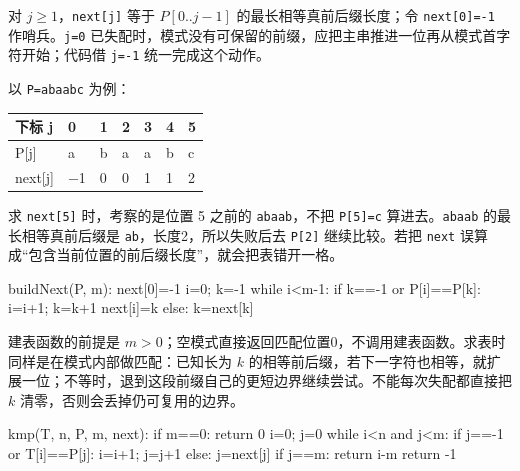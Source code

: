 对 \(j\ge1\)，\texttt{next[j]} 等于 \(P[0..j-1]\) 的最长相等真前后缀长度；令 \texttt{next[0]=\allowbreak{}-1} 作哨兵。\texttt{j=\allowbreak{}0} 已失配时，模式没有可保留的前缀，应把主串推进一位再从模式首字符开始；代码借 \texttt{j=\allowbreak{}-1} 统一完成这个动作。

以 \texttt{P=\allowbreak{}abaabc} 为例：

\begin{wideblock}\par\medskip\noindent\begin{minipage}{\linewidth}\fontsize{9.3}{12}\selectfont\begin{tabularx}{\linewidth}{@{}YYYYYYY@{}}
\toprule\noalign{}
下标 j & 0 & 1 & 2 & 3 & 4 & 5 \\
\midrule\noalign{}


P{[}j{]} & a & b & a & a & b & c \\
next{[}j{]} & \ensuremath{-}1 & 0 & 0 & 1 & 1 & 2 \\
\bottomrule\end{tabularx}
\end{minipage}\par\medskip\end{wideblock}

求 \texttt{next[5]} 时，考察的是位置 5 之前的 \texttt{abaab}，不把 \texttt{P[5]=\allowbreak{}c} 算进去。\texttt{abaab} 的最长相等真前后缀是 \texttt{ab}，长度2，所以失败后去 \texttt{P[2]} 继续比较。若把 \texttt{next} 误算成``包含当前位置的前后缀长度''，就会把表错开一格。

\begin{codeblock}[language={}]
buildNext(P, m):
    next[0]=-1
    i=0; k=-1
    while i<m-1:
        if k==-1 or P[i]==P[k]:
            i=i+1; k=k+1
            next[i]=k
        else:
            k=next[k]
\end{codeblock}

建表函数的前提是 \(m>0\)；空模式直接返回匹配位置0，不调用建表函数。求表时同样是在模式内部做匹配：已知长为 \(k\) 的相等前后缀，若下一字符也相等，就扩展一位；不等时，退到这段前缀自己的更短边界继续尝试。不能每次失配都直接把 \(k\) 清零，否则会丢掉仍可复用的边界。

\begin{codeblock}[language={}]
kmp(T, n, P, m, next):
    if m==0: return 0
    i=0; j=0
    while i<n and j<m:
        if j==-1 or T[i]==P[j]:
            i=i+1; j=j+1
        else:
            j=next[j]
    if j==m: return i-m
    return -1
\end{codeblock}

